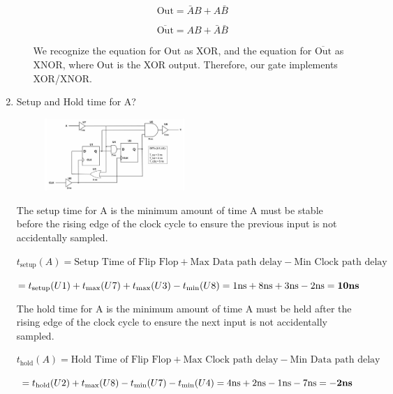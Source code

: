 \documentclass[fleqn]{article}
\begin{document}
\begin{enumerate}
\begin{enumerate}
			\begin{equation*}
				\text{Out} = \bar{A}B + A\bar{B}
			\end{equation*}
			
			\begin{equation*}
				\overline{\text{Out}} = AB + \bar{A}\bar{B}
			\end{equation*}
			
			We recognize the equation for $\text{Out}$ as XOR, and the equation for $\overline{\text{Out}}$ as XNOR, where $\text{Out}$ is the XOR output. Therefore, our gate implements XOR/XNOR.
			
			\end{enumerate}
			
		\item Setup and Hold time for A?
		
			\begin{figure}[H]
				\centerline{\includegraphics[width=0.5\textwidth]{circuit5.png}}
				\label{fig::circuit5}
			\end{figure}
			
			The setup time for A is the minimum amount of time A must be stable before the rising edge of the clock cycle to ensure the previous input is not accidentally sampled.
			
			$t_{\text{setup}}(A) = \text{Setup Time of Flip Flop} + \text{Max Data path delay} - \text{Min Clock path delay}$
			
			$ = t_{\text{setup}}(U1) + t_{\text{max}}(U7) + t_{\text{max}}(U3) - t_{\text{min}}(U8) = 1\text{ns} + 8\text{ns} + 3\text{ns} - 2\text{ns} = \mathbf{10\text{\textbf{ns}}}$
			
			The hold time for A is the minimum amount of time A must be held after the rising edge of the clock cycle to ensure the next input is not accidentally sampled.
			
			$t_{\text{hold}}(A) = \text{Hold Time of Flip Flop} + \text{Max Clock path delay} - \text{Min Data path delay}$
			
			$ = t_\text{hold}(U2) + t_{\text{max}}(U8) - t_{\text{min}}(U7) - t_{\text{min}}(U4) = 4\text{ns} + 2\text{ns} - 1\text{ns} - 7\text{ns} = \mathbf{-2\text{\textbf{ns}}}$
	\end{enumerate}
\end{document}
